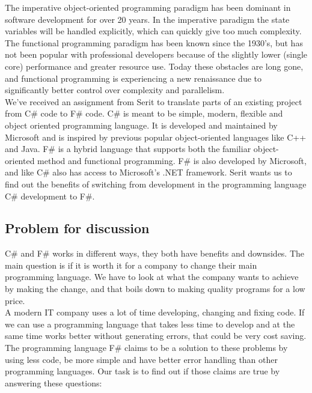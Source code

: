 \documentclass[12pt, a4paper]{article}
\begin{document}
The imperative object-oriented programming paradigm has been dominant in software development for over 20 years. In the imperative paradigm the state variables will be handled explicitly, which can quickly give too much complexity. The functional programming paradigm has been known since the 1930’s, but has not been popular with professional developers because of the slightly lower (single core) performance and greater resource use. Today these obstacles are long gone, and functional programming is experiencing a new renaissance due to significantly better control over complexity and parallelism.\\

We've received an assignment from Serit to translate parts of an existing project from C\# code to F\# code. C\# is meant to be simple, modern, flexible and object oriented programming language. It  is developed and maintained by Microsoft and is inspired by previous popular object-oriented languages like C++ and Java. F\# is a hybrid language that supports both the familiar object-oriented method and functional programming. F\# is also developed by Microsoft, and like C\# also has access to Microsoft’s .NET framework. Serit wants us to find out the benefits of  switching from development in the programming language C\# development to F\#.\\

\newpage
\subsection{Problem for discussion}
C\# and F\# works in different ways, they both have benefits and downsides. The main question is if it is worth it for a company to change their main programming language. We have to look at what the company wants to achieve by making the change, and that boils down to making quality programs for a low price. \\

A modern IT company uses a lot of time developing, changing and fixing code. If we can use a programming language that takes less time to develop and at the same time works better without generating errors, that could be very cost saving.\\

The programming language F\# claims to be a solution to these problems by using less code, be more simple and have better error handling than other programming languages. Our task is to find out if those claims are true by answering these questions:
\end{document}
